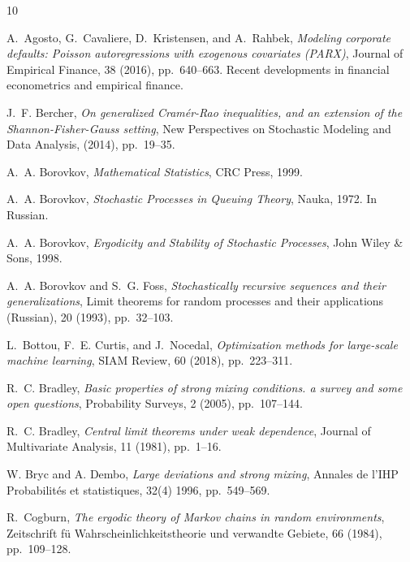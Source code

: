 \documentclass[a4paper,10pt]{article}
\begin{document}
\begin{thebibliography}{10}
	
	{\sc A.~Agosto, G.~Cavaliere, D.~Kristensen, and A.~Rahbek}, {\em Modeling
		corporate defaults: Poisson autoregressions with exogenous covariates
		(PARX)}, Journal of Empirical Finance, 38 (2016), pp.~640--663.
	\newblock Recent developments in financial econometrics and empirical finance.
	
	{\sc J.~F. Bercher}, {\em On generalized Cram\'er-Rao inequalities, and an extension of the Shannon-Fisher-Gauss setting}, New Perspectives on Stochastic Modeling and Data Analysis, (2014), pp.~19--35.
	
	{\sc A.~A. Borovkov}, {\em Mathematical Statistics}, CRC Press,
	1999.
	
	{\sc A.~A. Borovkov}, {\em Stochastic Processes in Queuing Theory}, Nauka,
	1972.
	\newblock In Russian.
	
	{\sc A.~A. Borovkov}, {\em Ergodicity and
		Stability of Stochastic Processes}, John Wiley \& Sons, 1998.
	
	{\sc A.~A. Borovkov and S.~G. Foss}, {\em Stochastically recursive sequences
		and their generalizations}, Limit theorems for random processes and their
	applications (Russian), 20 (1993), pp.~32--103.
	
	{\sc L.~Bottou, F.~E. Curtis, and J.~Nocedal}, {\em Optimization methods for
		large-scale machine learning}, {S}{I}{A}{M} Review, 60 (2018), pp.~223--311.
	
	{\sc R.~C. Bradley}, {\em Basic properties of strong mixing conditions. a
		survey and some open questions}, Probability Surveys, 2 (2005), pp.~107--144.
	
	{\sc R.~C. Bradley}, {\em Central limit theorems under weak dependence},
	Journal of Multivariate Analysis, 11 (1981), pp.~1--16.
	
	{\sc W. Bryc and A. Dembo}, {\em Large deviations and strong mixing}, Annales de l'IHP Probabilit\'es et statistiques, 32(4) 1996, pp.~549--569.
	
	{\sc R.~Cogburn}, {\em The ergodic theory of Markov chains in random environments}, Zeitschrift f{\"u} Wahrscheinlichkeitstheorie und verwandte
	Gebiete, 66 (1984), pp.~109--128.
	

\end{thebibliography}
\end{document}
